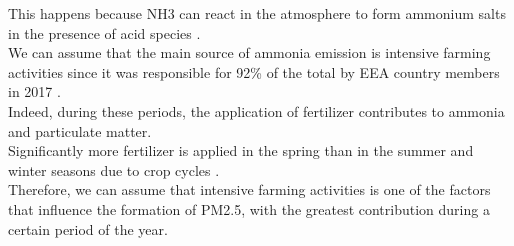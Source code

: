 This happens because NH3 can react in the atmosphere to form ammonium salts in the presence of acid species \cite{viatte2021ammonia}.\\
We can assume that the main source of ammonia emission is intensive farming activities  since it was responsible for 92\% of the total by EEA country members in 2017 \cite{maranzano2022air}.\\
Indeed, during these periods, the application of fertilizer contributes to ammonia and particulate matter.\\
Significantly more fertilizer is applied in the spring than in the summer and winter seasons due to crop cycles \cite{goebes2003ammonia}.\\
Therefore, we can assume that intensive farming activities  is one of the factors that influence the formation of PM2.5, with the greatest contribution during a certain period of the year.
